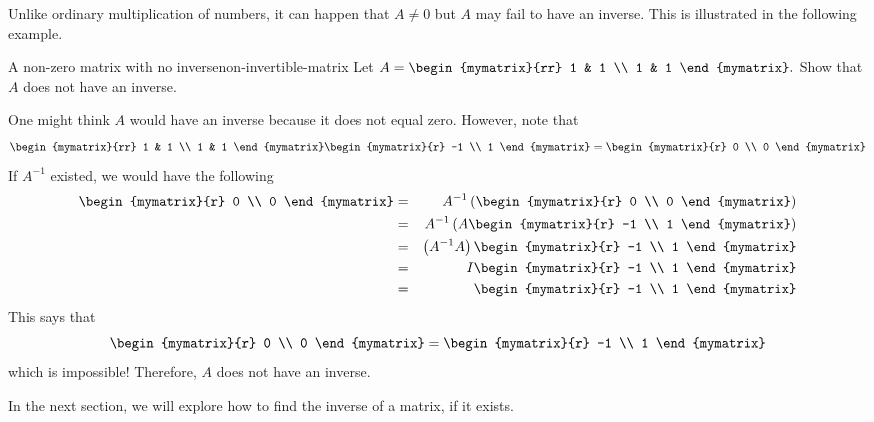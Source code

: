 Unlike ordinary multiplication of numbers, it can happen that $A\neq 0$ but 
$A$ may fail to have an inverse. This is illustrated in the following example.

\begin{example}{A non-zero matrix with no inverse}{non-invertible-matrix}
Let $A=\begin{mymatrix}{rr}
1 & 1 \\
1 & 1
\end{mymatrix} .$ Show that $A$ does not have an inverse.
\end{example}

\begin{solution} One might think $A$ would have an inverse because it does not equal zero.
However, note that 
\begin{equation*}
\begin{mymatrix}{rr}
1 & 1 \\
1 & 1
\end{mymatrix} \begin{mymatrix}{r}
-1 \\
1
\end{mymatrix} =\begin{mymatrix}{r}
0 \\
0
\end{mymatrix}
\end{equation*}
If $A^{-1}$ existed, we would have the following
\begin{eqnarray*}
\begin{mymatrix}{r}
0 \\
0
\end{mymatrix} &=& A^{-1}\tup{\begin{mymatrix}{r}
0 \\
0
\end{mymatrix} } \\
&=& A^{-1}\tup{A\begin{mymatrix}{r}
-1 \\
1
\end{mymatrix} } \\
&=&\tup{A^{-1}A} \begin{mymatrix}{r}
-1 \\
1
\end{mymatrix} \\
&=&I\begin{mymatrix}{r}
-1 \\
1
\end{mymatrix} \\
&=&\begin{mymatrix}{r}
-1 \\
1
\end{mymatrix}
\end{eqnarray*}
This says that 
\begin{equation*}
\begin{mymatrix}{r}
0 \\
0
\end{mymatrix}
=
\begin{mymatrix}{r}
-1 \\
1
\end{mymatrix}
\end{equation*}
which is impossible! Therefore, $A$ does not have an inverse. 
\end{solution}

In the next section, we will explore how to find the inverse of a matrix, if it exists. 
